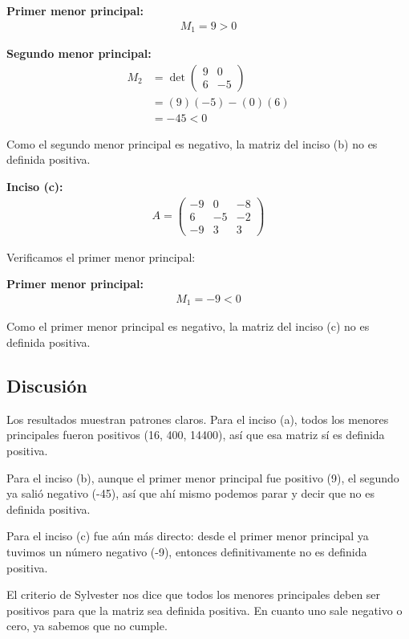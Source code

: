 \documentclass{article}
\begin{document}
\textbf{Primer menor principal:}
\begin{align}
M_1 = 9 > 0
\end{align}

\textbf{Segundo menor principal:}
\begin{align}
M_2 &= \det\begin{pmatrix} 9 & 0 \\ 6 & -5 \end{pmatrix} \\
&= (9)(-5) - (0)(6) \\
&= -45 < 0
\end{align}

Como el segundo menor principal es negativo, la matriz del inciso (b) no es definida positiva.

\textbf{Inciso (c):}
\begin{align}
     A=\begin{pmatrix} -9 & 0 & -8\\ 6 & -5 & -2\\ -9 & 3 & 3 \end{pmatrix}
\end{align}

Verificamos el primer menor principal:

\textbf{Primer menor principal:}
\begin{align}
M_1 = -9 < 0
\end{align}

Como el primer menor principal es negativo, la matriz del inciso (c) no es definida positiva.

\subsection{Discusión}

Los resultados muestran patrones claros. Para el inciso (a), todos los menores principales fueron positivos (16, 400, 14400), así que esa matriz sí es definida positiva.

Para el inciso (b), aunque el primer menor principal fue positivo (9), el segundo ya salió negativo (-45), así que ahí mismo podemos parar y decir que no es definida positiva.

Para el inciso (c) fue aún más directo: desde el primer menor principal ya tuvimos un número negativo (-9), entonces definitivamente no es definida positiva.

El criterio de Sylvester nos dice que todos los menores principales deben ser positivos para que la matriz sea definida positiva. En cuanto uno sale negativo o cero, ya sabemos que no cumple.
\end{document}
